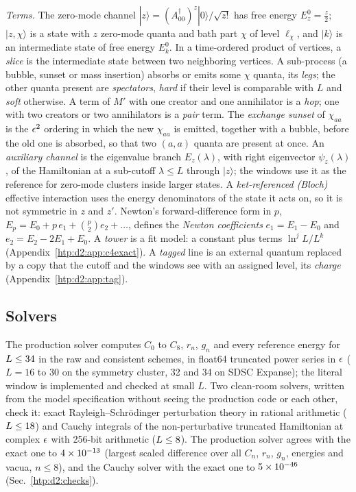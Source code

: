 \emph{Terms.} The zero-mode channel $|z\rangle=(A_{00}^\dagger)^z|0\rangle/\sqrt{z!}$ has free energy $E^0_z=\frac z2$;
$|z,\chi\rangle$ is a state with $z$ zero-mode quanta and bath part $\chi$ of level $\ell_\chi$, and $|k\rangle$ is an
intermediate state of free energy $E^0_k$. In a time-ordered product of vertices, a \emph{slice} is the intermediate state
between two neighboring vertices. A sub-process (a bubble, sunset or mass insertion) absorbs or emits some $\chi$ quanta,
its \emph{legs}; the other quanta present are \emph{spectators}, \emph{hard} if their level is comparable with $L$ and
\emph{soft} otherwise. A term of $M'$ with one creator and one annihilator is a \emph{hop}; one with two creators or two
annihilators is a \emph{pair} term. The \emph{exchange sunset} of $\chi_{aa}$ is the $\epsilon^2$ ordering in which the new
$\chi_{aa}$ is emitted, together with a bubble, before the old one is absorbed, so that two $(a,a)$ quanta are present at
once. An \emph{auxiliary channel} is the eigenvalue branch $E_z(\lambda)$, with right eigenvector $\psi_z(\lambda)$, of the
Hamiltonian at a sub-cutoff $\lambda\le L$ through $|z\rangle$; the windows use it as the reference for zero-mode clusters
inside larger states. A \emph{ket-referenced (Bloch)} effective interaction uses the energy denominators of the state it acts
on, so it is not symmetric in $z$ and $z'$. Newton's forward-difference form in $p$, $E_p=E_0+p\,e_1+\binom p2e_2+\dots$,
defines the \emph{Newton coefficients} $e_1=E_1-E_0$ and $e_2=E_2-2E_1+E_0$. A \emph{tower} is a fit model: a constant plus
terms $\ln^jL/L^k$ (Appendix~\ref{htp:d2:app:c4exact}). A \emph{tagged} line is an external quantum replaced by a copy that the
cutoff and the windows see with an assigned level, its \emph{charge} (Appendix~\ref{htp:d2:app:tag}).

\subsection{Solvers}\label{htp:d2:solvers}
The production solver  computes $C_0$ to $C_8$, $r_n$, $g_n$ and every reference energy for
$L\le34$ in the raw and consistent schemes, in float64 truncated power series in $\epsilon$ ($L=16$ to 30 on the symmetry cluster, 32 and 34
on SDSC Expanse); the literal window is implemented and checked at small $L$. Two clean-room solvers, written from the model specification without seeing the production code or each other,
check it: exact Rayleigh--Schr\"odinger perturbation theory in rational arithmetic ($L\le18$) and Cauchy integrals of
the non-perturbative truncated Hamiltonian at complex $\epsilon$ with 256-bit arithmetic ($L\le8$). The production
solver agrees with the exact one to $4\times10^{-13}$ (largest scaled difference over all $C_n$, $r_n$, $g_n$, energies and
vacua, $n\le8$), and the Cauchy solver with the exact one to $5\times10^{-46}$ (Sec.~\ref{htp:d2:checks}).

